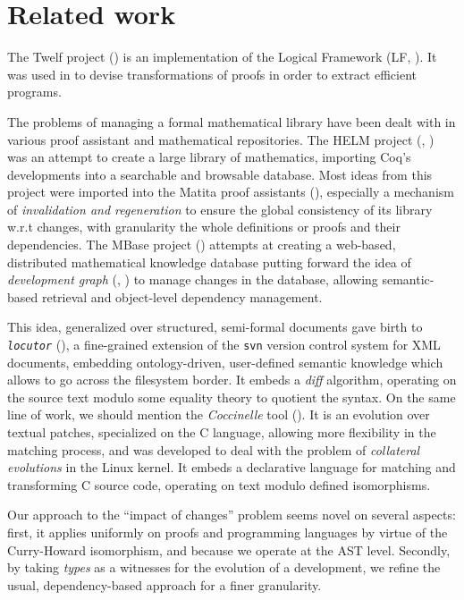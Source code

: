 \documentclass{article}
\begin{document}
\section{Related work}
\label{rw}

The \textsf{Twelf} project (\cite{pfenning1999system}) is an
implementation of the Logical Framework (LF,
\cite{harper1993framework}). It was used in \cite{anderson1993program}
to devise transformations of proofs in order to extract efficient
programs.

The problems of managing a formal mathematical library have been dealt
with in various proof assistant and mathematical repositories. The
HELM project (\cite{asperti2000content}, \cite{asperti2006content})
was an attempt to create a large library of mathematics, importing
\textsf{Coq}'s developments into a searchable and browsable database.
Most ideas from this project were imported into the \textsf{Matita}
proof assistants (\cite{asperti2007hop}), especially a mechanism of
\emph{invalidation and regeneration} to ensure the global consistency
of its library w.r.t changes, with granularity the whole definitions
or proofs and their dependencies. The MBase project
(\cite{kohlhase2001mbase}) attempts at creating a web-based,
distributed mathematical knowledge database putting forward the idea
of \emph{development graph} (\cite{hutter2000management},
\cite{autexier2000towards}) to manage changes in the database,
allowing semantic-based retrieval and object-level dependency
management.

This idea, generalized over structured, semi-formal documents gave
birth to \texttt{\it locutor} (\cite{muller2008fine}), a fine-grained
extension of the \texttt{svn} version control system for XML
documents, embedding ontology-driven, user-defined semantic knowledge
which allows to go across the filesystem border. It embeds a
\emph{diff} algorithm, operating on the source text modulo some
equality theory to quotient the syntax. On the same line of work, we
should mention the \emph{Coccinelle} tool
(\cite{padioleau2008documenting}). It is an evolution over textual
patches, specialized on the C language, allowing more flexibility in
the matching process, and was developed to deal with the problem of
\emph{collateral evolutions} in the Linux kernel. It embeds a
declarative language for matching and transforming C source code,
operating on text modulo defined isomorphisms.

Our approach to the ``impact of changes'' problem seems novel on
several aspects: first, it applies uniformly on proofs and programming
languages by virtue of the Curry-Howard isomorphism, and because we
operate at the AST level. Secondly, by taking \emph{types} as a
witnesses for the evolution of a development, we refine the usual,
dependency-based approach for a finer granularity.
\end{document}
